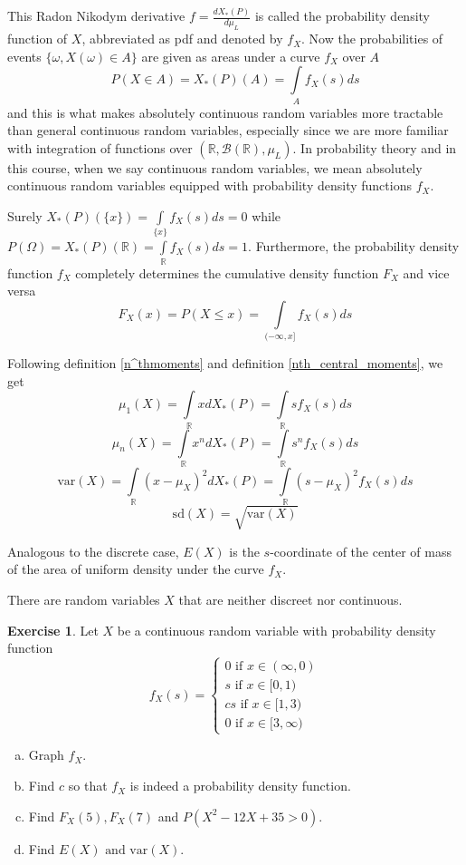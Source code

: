 \documentclass[12pt]{amsart}
\theoremstyle{definition}
\newtheorem{exercise}[theorem]{Exercise}
\begin{document}
This Radon Nikodym derivative $f = \frac{dX_*(P)}{d\mu_L}$ is called the probability density function of $X$, abbreviated as pdf and denoted by $f_X$. Now the probabilities of events $\{\omega, X(\omega) \in A\}$ are given as areas under a curve $f_X$ over $A$
$$P(X \in A) = X_*(P)(A) = \int\limits_A f_X(s) ds$$
and this is what makes absolutely continuous random variables more tractable than general continuous random variables, especially since we are more familiar with integration of functions over $(\mathbb{R}, \mathcal{B}(\mathbb{R}), \mu_L)$. In probability theory and in this course, when we say continuous random variables, we mean absolutely continuous random variables equipped with probability density functions $f_X$.

Surely $X_*(P)(\{x\}) = \int\limits_{\{x\}} f_X(s) ds = 0$ while $P(\Omega) = X_*(P)(\mathbb{R}) = \int\limits_{\mathbb{R}} f_X(s) ds = 1$. Furthermore, the probability density function $f_X$ completely determines the cumulative density function $F_X$ and vice versa
$$F_X(x) = P(X \leq x) = \int\limits_{(-\infty, x]} f_X(s) ds$$

Following definition \ref{n^thmoments} and definition \ref{nth_central_moments}, we get
$$\mu_1(X) = \int\limits_{\mathbb{R}} x dX_*(P) = \int\limits_{\mathbb{R}} s f_X(s) ds$$
$$\mu_n(X) = \int\limits_{\mathbb{R}} x^n dX_*(P) = \int\limits_{\mathbb{R}} s^n f_X(s) ds$$
$$\text{var}(X) = \int\limits_{\mathbb{R}} (x - \mu_X)^2 dX_*(P) = \int\limits_{\mathbb{R}} (s - \mu_X)^2 f_X(s) ds$$
$$\text{sd}(X) = \sqrt{\text{var}(X)}$$

Analogous to the discrete case, $E(X)$ is the $s$-coordinate of the center of mass of the area of uniform density under the curve $f_X$.

\remark There are random variables $X$ that are neither discreet nor continuous.

\begin{exercise} Let $X$ be a continuous random variable with probability density function
$$f_X(s) = \begin{cases} 0 \text{ if } x \in (\infty, 0) \\ s \text{ if } x \in [0, 1) \\ cs \text{ if } x \in [1, 3) \\ 0 \text{ if } x \in [3, \infty) \end{cases}$$
\begin{enumerate}[a.]
\item Graph $f_X$.
\item Find $c$ so that $f_X$ is indeed a probability density function.
\item Find $F_X(5), F_X(7)$ and $P(X^2 - 12X + 35 > 0)$.
\item Find $E(X) \text{ and } \text{var}(X)$.
\end{enumerate}
\end{exercise}
\end{document}
